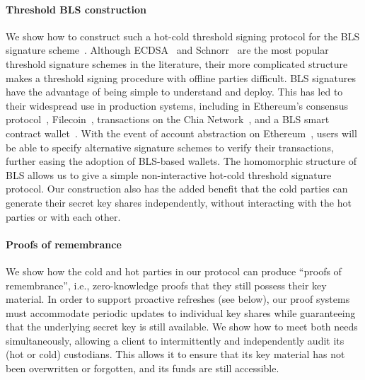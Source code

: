 \paragraph{Threshold BLS construction}
We show how to construct such a hot-cold threshold signing protocol for the BLS signature scheme~\cite{AC:BonLynSha01,PKC:Boldyreva03}. Although ECDSA~\cite{EPRINT:GenGolNar16,SP:DKLs18,CCS:LinNof18,CCS:GenGol18,EPRINT:AumHamShl20,EPRINT:GKSS20,EPRINT:DJNPO20,CCS:CGGMP20,PKC:CCLST20,EPRINT:CCLST21,CANS:Pettit21,SP:ANOSS22} and Schnorr~\cite{SAC:KomGol20,C:BCKMTZ22,EPRINT:BatLonMen22} are the most popular threshold signature schemes in the literature, their more complicated structure makes a threshold signing procedure with offline parties difficult. 
BLS signatures have the advantage of being simple to understand and deploy. This has led to their widespread use in production systems, including in Ethereum's consensus protocol~\cite[\S2.9.1]{eth2book}, Filecoin~\cite{Filecoin_Spec}, transactions on the Chia Network~\cite{chia_bls}, and a BLS smart contract wallet~\cite{bls_wallet}.
With the event of account abstraction on Ethereum~\cite{account_abstraction}, users will be able to specify alternative signature schemes to verify their transactions, further easing the adoption of BLS-based wallets. 
The homomorphic structure of BLS allows us to give a simple non-interactive hot-cold threshold signature protocol. 
Our construction also has the added benefit that the cold parties can generate their secret key shares independently, without interacting with the hot parties or with each other. 

\paragraph{Proofs of remembrance}
We show how the cold and hot parties in our protocol can produce ``proofs of remembrance'', i.e., zero-knowledge proofs that they still possess their key material. In order to support proactive refreshes (see below), our proof systems must accommodate periodic updates to individual key shares while guaranteeing that the underlying secret key is still available. We show how to meet both needs simultaneously, allowing a client to intermittently and independently audit its (hot or cold) custodians. This allows it to ensure that its key material has not been overwritten or forgotten, and its funds are still accessible.

